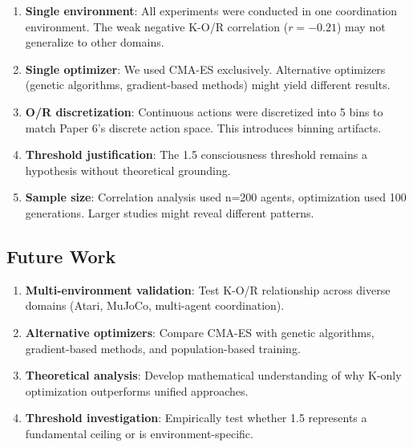 \documentclass[twoside]{article}
\theoremstyle{remark}
\begin{document}
\begin{enumerate}
    \item \textbf{Single environment}: All experiments were conducted in one
    coordination environment. The weak negative K-O/R correlation ($r = -0.21$)
    may not generalize to other domains.

    \item \textbf{Single optimizer}: We used CMA-ES exclusively. Alternative
    optimizers (genetic algorithms, gradient-based methods) might yield
    different results.

    \item \textbf{O/R discretization}: Continuous actions were discretized
    into 5 bins to match Paper 6's discrete action space. This introduces
    binning artifacts.

    \item \textbf{Threshold justification}: The 1.5 consciousness threshold
    remains a hypothesis without theoretical grounding.

    \item \textbf{Sample size}: Correlation analysis used n=200 agents,
    optimization used 100 generations. Larger studies might reveal different
    patterns.
\end{enumerate}

\subsection{Future Work}

\begin{enumerate}
    \item \textbf{Multi-environment validation}: Test K-O/R relationship
    across diverse domains (Atari, MuJoCo, multi-agent coordination).

    \item \textbf{Alternative optimizers}: Compare CMA-ES with genetic
    algorithms, gradient-based methods, and population-based training.

    \item \textbf{Theoretical analysis}: Develop mathematical understanding
    of why K-only optimization outperforms unified approaches.

    \item \textbf{Threshold investigation}: Empirically test whether 1.5
    represents a fundamental ceiling or is environment-specific.
\end{enumerate}

\end{document}
